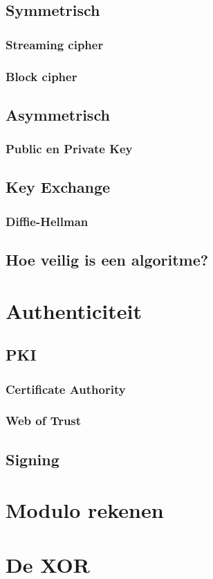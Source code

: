 \documentclass[a4paper,12pt,twoside,openright,titlepage]{book}
\begin{document}
\section{Symmetrisch}

\subsection{Streaming cipher}


\subsection{Block cipher}



\section{Asymmetrisch}

\subsection{Public en Private Key}

\section{Key Exchange}

\subsection{Diffie-Hellman}

\section{Hoe veilig is een algoritme?}



\chapter{Authenticiteit}

\section{PKI}

\subsection{Certificate Authority}


\subsection{Web of Trust}

\section{Signing}


\begin{appendices}
	\chapter{Modulo rekenen}\label{chap:modulo}

	\chapter{De XOR}\label{chap:xor}

\end{appendices}

\printindex
\end{document}
